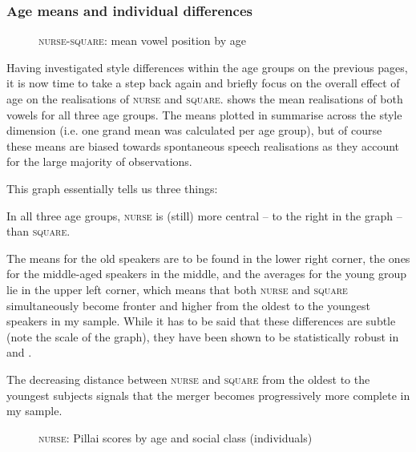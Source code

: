 \subsubsection{Age means and individual differences}

\begin{figure}
	
		
	\caption{\textsc{nurse}-\textsc{square}: mean vowel position by age}
	\label{fig.nurse.space.means}
\end{figure}

Having investigated style differences within the age groups on the previous pages, it is now time to take a step back again and briefly focus on the overall effect of age on the realisations of \textsc{nurse} and \textsc{square}.
 shows the mean realisations of both vowels for all three age groups.
The means plotted in  summarise across the style dimension (i.e. one grand mean was calculated per age group), but of course these means are biased towards spontaneous speech realisations as they account for the large majority of observations.

\newpage 
This graph essentially tells us three things:
\begin{inparaenum}[(1)]
	\item In all three age groups, \textsc{nurse} is (still) more central -- to the right in the graph -- than \textsc{square}.
	\item The means for the old speakers are to be found in the lower right corner, the ones for the middle-aged speakers in the middle, and the averages for the young group lie in the upper left corner, which means that both \textsc{nurse} and \textsc{square} simultaneously become fronter and higher from the oldest to the youngest speakers in my sample.
	While it has to be said that these differences are subtle (note the scale of the graph), they have been shown to be statistically robust in  and .
	\item The decreasing distance between \textsc{nurse} and \textsc{square}  from the oldest to the youngest subjects signals that the merger becomes progressively more complete in my sample.
\end{inparaenum}

\begin{figure}
	
		
	\caption{\textsc{nurse}: Pillai scores by age and social class (individuals)}
	\label{fig.scatter.pillai.nurse}
\end{figure}

